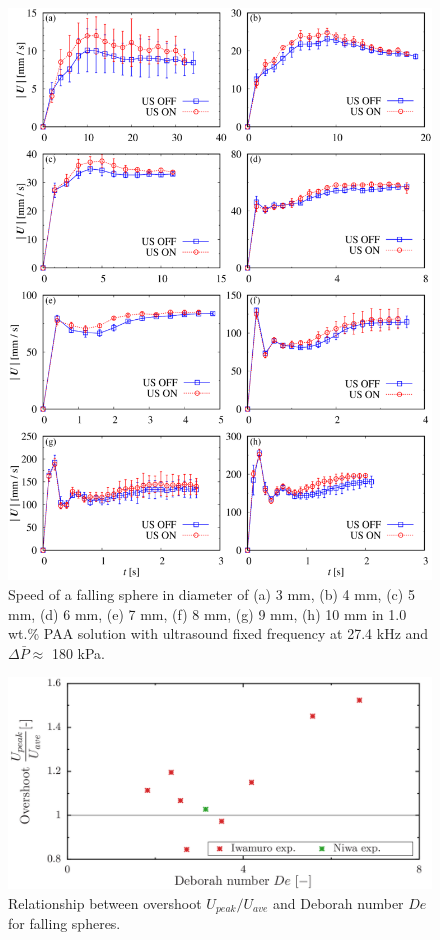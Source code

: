 \begin{figure}[ht]
    \begin{center}
        \includegraphics[width=13cm,clip]{X-Appendix/over_shoot/iwamuro-fall.png}
        \caption{Speed of a falling sphere in diameter of (a) 3 mm, (b) 4 mm, (c) 5 mm, (d) 6 mm, (e) 7 mm, (f) 8 mm, (g) 9 mm, (h) 10 mm in 1.0 wt.\% PAA solution with ultrasound fixed frequency at 27.4 kHz and $\Delta \bar{P} \approx$ 180 kPa\cite{ref:8}.}
        \label{fig:iwamuro-fall}
    \end{center}
\end{figure}

\begin{figure}[ht]
    \begin{center}
        \includegraphics[width=15cm,clip]{5-Results/De-overshoot.png}
        \caption{Relationship between overshoot $U_{peak}/U_{ave}$ and Deborah number $De$ for falling spheres.}
        \label{fig:De-overshoot}
    \end{center}
\end{figure}

